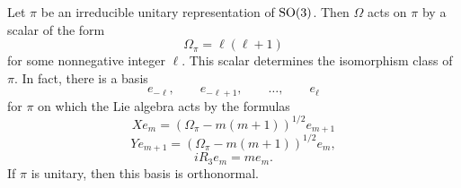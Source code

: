 \documentclass[reqno]{amsart} 
\numberwithin{equation}{section}
\begin{document}
\begin{proposition}\label{proposition:d1a913c915d4}
  Let $\pi$ be an irreducible unitary representation of $\operatorname{SO}(3)$.  Then $\Omega$ acts on $\pi$ by a scalar of the form
  \begin{equation}\label{eqn:d1a9136775d2}
    \Omega_\pi = \ell (\ell + 1)
  \end{equation}
  for some nonnegative integer $\ell$.  This scalar determines the isomorphism class of $\pi$.  In fact, there is a basis
  \begin{equation*}
    e_{- \ell}, \qquad e_{- \ell + 1}, \qquad \dotsc, \qquad e_{\ell }
  \end{equation*}
  for $\pi$ on which the Lie algebra acts by the formulas
  \begin{equation}\label{eqn:d1a913647caa}
    X e_m = \left( \Omega_\pi  - m (m + 1) \right)^{1/2} e_{m + 1}
  \end{equation}
  \begin{equation}\label{eqn:d1a9136592ce}
    Y e_{m+1} = \left( \Omega_\pi - m (m + 1) \right)^{1/2} e_{m},
  \end{equation}
  \begin{equation}\label{eqn:d1a91367ba12}
    i R_3 e_m = m e_m.
  \end{equation}
  If $\pi$ is unitary, then this basis is orthonormal.
\end{proposition}
\end{document}
